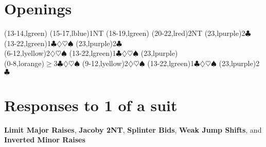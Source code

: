\documentclass{article}
\def\C{$\clubsuit$}
\def\D{$\diamondsuit$}
\def\H{$\heartsuit$}
\def\S{$\spadesuit$}
\let\TeXge\ge
\def\ge{$\TeXge$}
\begin{document}
\def\ob#1#2{\@@bid{#1}{lorange}{#2}}
\def\yb#1#2{\@@bid{#1}{lyellow}{#2}}
\def\gb#1#2{\@@bid{#1}{lgreen}{#2}}
\def\bb#1#2{\@@bid{#1}{lblue}{#2}}
\def\pb#1#2{\@@bid{#1}{lred}{#2}}
\def\vb#1#2{\@@bid{#1}{lpurple}{#2}}
\def\ab#1#2{\@@bid{#1}{laqua}{#2}}

\def\oc#1#2{\@@bid{#1}{lorange}{}}
\def\yc#1#2{\@@bid{#1}{lyellow}{}}
\def\gc#1#2{\@@bid{#1}{lgreen}{}}
\def\bc#1#2{\@@bid{#1}{lblue}{}}
\def\pc#1#2{\@@bid{#1}{lred}{}}
\def\vc#1#2{\@@bid{#1}{lpurple}{}}
\def\ac#1#2{\@@bid{#1}{laqua}{}}

\def\ic{\futurelet\@foo\@ic}
\def\@ic{\let\@next\g@ic\ifx\@foo\egroup\let\@next\relax\fi\@next}
\def\g@ic#1{\futurelet\@foo\@ic}

\def\ditto#1{\raise 0.18pc\hbox to #1{\leaders\hrule\hfill\lower 0.4pc\hbox{\kern1ex''\kern0.6ex}\leaders\hrule\hfill}}

\def\savenote#1#2{\begingroup\count@\value{footnote}\advance\count@\@ne\xdef#1{\the\count@}\endgroup\footnote{#2}}

\section{Openings}

\begin{ptable}
  \bid(13-14,lgreen){}
  \bid(15-17,lblue){1NT}
  \bid(18-19,lgreen){}
  \bid(20-22,lred){2NT}
  \bid*(23,lpurple){2\C}\\%
{}
  \bid*(13-22,lgreen){1\C\D\H\S}
  \bid*(23,lpurple){2\C}\\%
{}
  \bid(6-12,lyellow){2\D\H\S}
  \bid(13-22,lgreen){1\C\D\H\S}
  \bid(23,lpurple){\cdrop[-.45pc]{2\C}}\\%
{}
  \bid(0-8,lorange){\ge3\C\D\H\S}
  \bid*(9-12,lyellow){2\D\H\S}
  \bid*(13-22,lgreen){1\C\D\H\S}
  \bid*(23,lpurple){2\C}\\
\end{ptable}

\section{Responses to 1 of a suit}
\textbf{Limit Major Raises}, \textbf{Jacoby 2NT},
\textbf{Splinter Bids}, \textbf{Weak Jump Shifts}, and \textbf{Inverted
Minor Raises}\\
\end{document}
